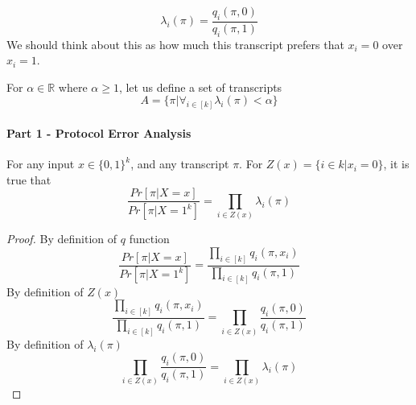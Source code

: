 \begin{definition}
\begin{equation*}
    \lambda _i (\pi) = \frac{q_i(\pi, 0)}{q_i(\pi, 1)}
\end{equation*}
We should think about this as how much this transcript prefers that $x_i = 0$ over $x_i = 1$.
\end{definition}

\begin{definition}
For $\alpha \in \mathbb{R}$ where $\alpha \geq 1$, let us define a set of transcripts 
\begin{equation*}
    A = \{\pi | \forall_{i \in [k]} \lambda_i (\pi) < \alpha \}
\end{equation*}
\end{definition}


\paragraph{Part 1 - Protocol Error Analysis}
\begin{lemma}
For any input $x \in \{0,1\}^k$, and any transcript $\pi$. For $Z(x) = \{i \in k | x_i = 0\}$, it is true that  \newline
\begin{equation*}
    \frac{Pr[\pi | X = x]}{Pr[\pi | X = 1^k]} = \prod_{i \in Z(x)} \lambda_i(\pi)
\end{equation*}
\end{lemma}
\begin{proof}
By definition of $q$ function
\begin{equation*}
    \frac{Pr[\pi | X = x]}{Pr[\pi | X = 1^k]} = \frac{\prod_{i \in [k]} q_i (\pi, x_i)}{\prod_{i \in [k]} q_i (\pi, 1)}
\end{equation*}
By definition of $Z(x)$
\begin{equation*}
    \frac{\prod_{i \in [k]} q_i (\pi, x_i)}{\prod_{i \in [k]} q_i (\pi, 1)} = \prod_{i \in Z(x)} \frac{q_i (\pi, 0)}{q_i (\pi, 1)}
\end{equation*}
By definition of $\lambda_i (\pi)$
\begin{equation*}
    \prod_{i \in Z(x)} \frac{q_i (\pi, 0)}{q_i (\pi, 1)} = \prod_{i \in Z(x)} \lambda_i (\pi)
\end{equation*}
\end{proof}

